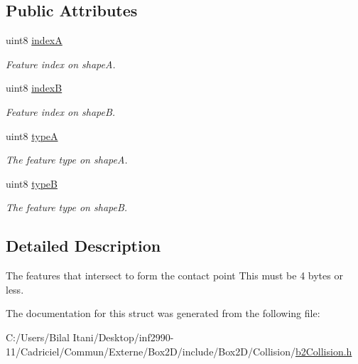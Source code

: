 \subsection*{Public Attributes}
\begin{DoxyCompactItemize}
\item 
uint8 \hyperlink{structb2_contact_feature_a833bc746e7cb5e3cd458f1c0809101d0}{indexA}\hypertarget{structb2_contact_feature_a833bc746e7cb5e3cd458f1c0809101d0}{}\label{structb2_contact_feature_a833bc746e7cb5e3cd458f1c0809101d0}

\begin{DoxyCompactList}\small\item\em Feature index on shapeA. \end{DoxyCompactList}\item 
uint8 \hyperlink{structb2_contact_feature_ad96712b6a0cc1f4b22b85b5948eab81d}{indexB}\hypertarget{structb2_contact_feature_ad96712b6a0cc1f4b22b85b5948eab81d}{}\label{structb2_contact_feature_ad96712b6a0cc1f4b22b85b5948eab81d}

\begin{DoxyCompactList}\small\item\em Feature index on shapeB. \end{DoxyCompactList}\item 
uint8 \hyperlink{structb2_contact_feature_a3361b651f0a88fb60ec6aba9f4921cc2}{typeA}\hypertarget{structb2_contact_feature_a3361b651f0a88fb60ec6aba9f4921cc2}{}\label{structb2_contact_feature_a3361b651f0a88fb60ec6aba9f4921cc2}

\begin{DoxyCompactList}\small\item\em The feature type on shapeA. \end{DoxyCompactList}\item 
uint8 \hyperlink{structb2_contact_feature_abb74afd6ee5b60834a3f8e2616182bdf}{typeB}\hypertarget{structb2_contact_feature_abb74afd6ee5b60834a3f8e2616182bdf}{}\label{structb2_contact_feature_abb74afd6ee5b60834a3f8e2616182bdf}

\begin{DoxyCompactList}\small\item\em The feature type on shapeB. \end{DoxyCompactList}\end{DoxyCompactItemize}


\subsection{Detailed Description}
The features that intersect to form the contact point This must be 4 bytes or less. 

The documentation for this struct was generated from the following file\+:\begin{DoxyCompactItemize}
\item 
C\+:/\+Users/\+Bilal Itani/\+Desktop/inf2990-\/11/\+Cadriciel/\+Commun/\+Externe/\+Box2\+D/include/\+Box2\+D/\+Collision/\hyperlink{b2_collision_8h}{b2\+Collision.\+h}\end{DoxyCompactItemize}
